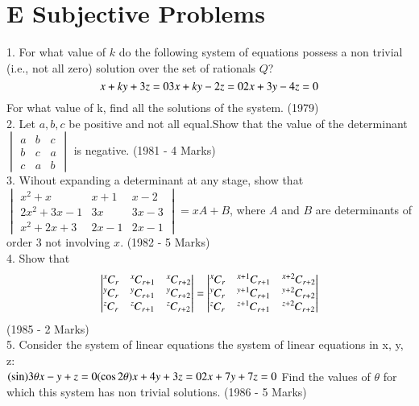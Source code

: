 \documentclass[journal,12pt,twocolumn]{IEEEtran}
\newcommand\Comb[2][^n]{\prescript{#1\mkern-0.5mu}{}C_{#2}}
\theoremstyle{remark}
\begin{document}
\section{E Subjective Problems}

1. For what value of $k$ do the following system of equations possess a non trivial (i.e., not all zero) solution over the set of rationals $Q$?
$$x+ky+3z=0\\3x+ky-2z=0\\2x+3y-4z=0$$ For what value of k, find all the solutions of the system. \hfill (1979)\\[2pt]

2. Let $a,b,c$ be positive and not all equal.Show that the value of the determinant $\begin{vmatrix}a&b&c\\b&c&a\\c&a&b\end{vmatrix}$ is negative. \hfill (1981 - 4 Marks)\\[2pt]


3. Wihout expanding a determinant at any stage, show that $\begin{vmatrix}x^2+x&x+1&x-2\\2x^2+3x-1&3x&3x-3\\x^2+2x+3&2x-1&2x-1\end{vmatrix}=xA+B$, where $A$ and $B$ are determinants of order 3 not involving $x$. \hfill (1982 - 5 Marks)\\[2pt]


4. Show that $$\begin{vmatrix}\Comb[x]{r}&\Comb[x]{r+1}&\Comb[x]{r+2}\\\Comb[y]{r}&\Comb[y]{r+1}&\Comb[y]{r+2}\\\Comb[z]{r}&\Comb[z]{r+1}&\Comb[z]{r+2}\end{vmatrix}=\begin{vmatrix}\Comb[x]{r}&\Comb[x+1]{r+1}&\Comb[x+2]{r+2}\\\Comb[y]{r}&\Comb[y+1]{r+1}&\Comb[y+2]{r+2}\\\Comb[z]{r}&\Comb[z+1]{r+1}&\Comb[z+2]{r+2}\end{vmatrix}$$ \hfill (1985 - 2 Marks)\\[2pt]

	
5. Consider the system of linear equations the system of linear equations in x, y, z:\\$(\sin) 3\theta x-y+z=0\\(\cos 2\theta)x+4y+3z=0\\2x+7y+7z=0\\$ Find the values of $\theta$ for which this system has non trivial solutions. \hfill (1986 - 5 Marks)\\[2pt]
\end{document}

